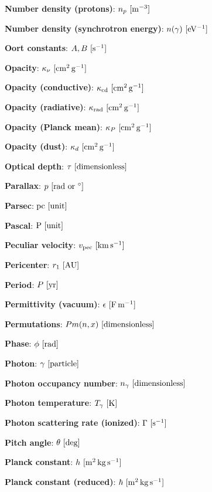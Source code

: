 \documentclass[a4paper,10pt]{article}
\begin{document}
{\noindent}\textbf{Number density (protons)}: $n_p ~ [{\rm m^{-3}}]$

{\noindent}\textbf{Number density (synchrotron energy)}: $n(\gamma) ~ [{\rm eV^{-1}}]$

{\noindent}\textbf{Oort constants}: $A,B ~ [{\rm s^{-1}}]$

{\noindent}\textbf{Opacity}: $\kappa_\nu ~ [{\rm cm^2\,g^{-1}}]$

{\noindent}\textbf{Opacity (conductive)}: $\kappa_{\rm cd} ~ [{\rm cm^2\,g^{-1}}]$

{\noindent}\textbf{Opacity (radiative)}: $\kappa_{\rm rad} ~ [{\rm cm^2\,g^{-1}}]$

{\noindent}\textbf{Opacity (Planck mean)}: $\kappa_P ~ [{\rm cm^2\,g^{-1}}]$

{\noindent}\textbf{Opacity (dust)}: $\kappa_d ~ [{\rm cm^2\,g^{-1}}]$

{\noindent}\textbf{Optical depth}: $\tau ~ [{\rm dimensionless}]$

{\noindent}\textbf{Parallax}: $p ~ [{\rm rad~or~^\circ}]$

{\noindent}\textbf{Parsec}: ${\rm pc} ~ [{\rm unit}]$

{\noindent}\textbf{Pascal}: ${\rm P} ~ [{\rm unit}]$

{\noindent}\textbf{Peculiar velocity}: $v_{\rm pec} ~ [{\rm km\,s^{-1}}]$

{\noindent}\textbf{Pericenter}: $r_1 ~ [{\rm AU}]$

{\noindent}\textbf{Period}: $P ~ [{\rm yr}]$

{\noindent}\textbf{Permittivity (vacuum)}: $\epsilon ~ [{\rm F\,m^{-1}}]$

{\noindent}\textbf{Permutations}: $Pm(n,x) ~ [{\rm dimensionless}]$

{\noindent}\textbf{Phase}: $\phi ~ [{\rm rad}]$

{\noindent}\textbf{Photon}: $\gamma ~ [{\rm particle}]$

{\noindent}\textbf{Photon occupancy number}: $n_\gamma ~ [{\rm dimensionless}]$

{\noindent}\textbf{Photon temperature}: $T_\gamma ~ [{\rm K}]$

{\noindent}\textbf{Photon scattering rate (ionized)}: $\Gamma ~ [{\rm s^{-1}}]$

{\noindent}\textbf{Pitch angle}: $\theta ~ [{\rm deg}]$

{\noindent}\textbf{Planck constant}: $h ~ [{\rm m^2\,kg\,s^{-1}}]$

{\noindent}\textbf{Planck constant (reduced)}: $\hbar ~ [{\rm m^2\,kg\,s^{-1}}]$
\end{document}
